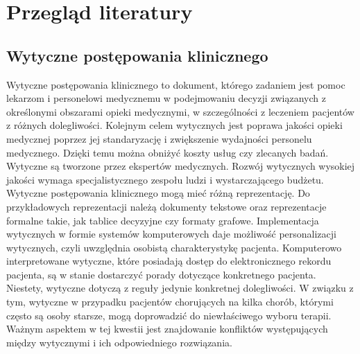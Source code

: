 \chapter{Przegląd literatury}
\section{Wytyczne postępowania klinicznego}

Wytyczne postępowania klinicznego\cite{Boyd, Latoszek-Berendsen} to dokument, którego zadaniem jest pomoc lekarzom i personelowi medycznemu w podejmowaniu decyzji związanych z określonymi obszarami opieki medycznymi, w szczególności z leczeniem pacjentów z różnych dolegliwości. Kolejnym celem wytycznych jest poprawa jakości opieki medycznej poprzez jej standaryzację i zwiększenie wydajności personelu medycznego. Dzięki temu można obniżyć koszty usług czy zlecanych badań. Wytyczne są tworzone przez ekspertów medycznych. Rozwój wytycznych wysokiej jakości wymaga specjalistycznego zespołu ludzi i wystarczającego budżetu. Wytyczne postępowania klinicznego mogą mieć różną reprezentację. Do przykładowych reprezentacji należą dokumenty tekstowe oraz reprezentacje formalne takie, jak tablice decyzyjne czy formaty grafowe. Implementacja wytycznych w formie systemów komputerowych daje możliwość personalizacji wytycznych, czyli uwzględnia osobistą charakterystykę pacjenta. Komputerowo interpretowane wytyczne, które posiadają dostęp do elektronicznego rekordu pacjenta, są w stanie dostarczyć porady dotyczące konkretnego pacjenta. Niestety, wytyczne dotyczą z reguły jedynie konkretnej dolegliwości. W związku z tym, wytyczne w przypadku pacjentów chorujących na kilka chorób, którymi często są osoby starsze, mogą doprowadzić do niewłaściwego wyboru terapii. Ważnym aspektem w tej kwestii jest znajdowanie konfliktów występujących między wytycznymi i ich odpowiedniego rozwiązania.


